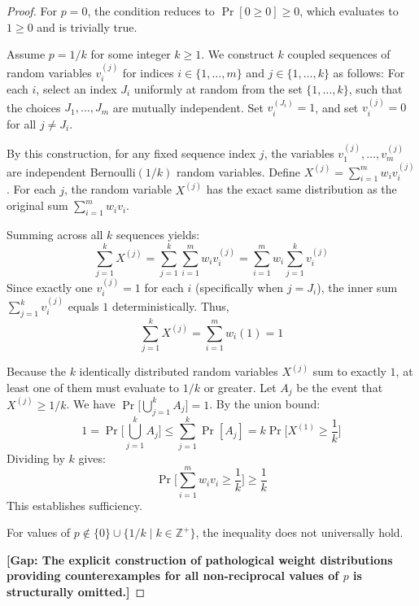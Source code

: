 \begin{proof}
For $p = 0$, the condition reduces to $\Pr[0 \ge 0] \ge 0$, which evaluates to $1 \ge 0$ and is trivially true.

Assume $p = 1/k$ for some integer $k \ge 1$. 
We construct $k$ coupled sequences of random variables $v_i^{(j)}$ for indices $i \in \{1, \dots, m\}$ and $j \in \{1, \dots, k\}$ as follows:
For each $i$, select an index $J_i$ uniformly at random from the set $\{1, \dots, k\}$, such that the choices $J_1, \ldots, J_m$ are mutually independent. 
Set $v_i^{(J_i)} = 1$, and set $v_i^{(j)} = 0$ for all $j \neq J_i$.

By this construction, for any fixed sequence index $j$, the variables $v_1^{(j)}, \ldots, v_m^{(j)}$ are independent Bernoulli$(1/k)$ random variables. 
Define $X^{(j)} = \sum_{i=1}^m w_i v_i^{(j)}$. 
For each $j$, the random variable $X^{(j)}$ has the exact same distribution as the original sum $\sum_{i=1}^m w_i v_i$.

Summing across all $k$ sequences yields:
\[\sum_{j=1}^k X^{(j)} = \sum_{j=1}^k \sum_{i=1}^m w_i v_i^{(j)} = \sum_{i=1}^m w_i \sum_{j=1}^k v_i^{(j)}\]
Since exactly one $v_i^{(j)} = 1$ for each $i$ (specifically when $j = J_i$), the inner sum $\sum_{j=1}^k v_i^{(j)}$ equals $1$ deterministically.
Thus,
\[\sum_{j=1}^k X^{(j)} = \sum_{i=1}^m w_i (1) = 1\]

Because the $k$ identically distributed random variables $X^{(j)}$ sum to exactly $1$, at least one of them must evaluate to $1/k$ or greater. 
Let $A_j$ be the event that $X^{(j)} \ge 1/k$. We have $\Pr\Big[\bigcup_{j=1}^k A_j\Big] = 1$.
By the union bound:
\[ 1 = \Pr\Big[\bigcup_{j=1}^k A_j\Big] \le \sum_{j=1}^k \Pr[A_j] = k \Pr\Big[X^{(1)} \ge \frac{1}{k}\Big] \]
Dividing by $k$ gives:
\[ \Pr\Big[\sum_{i=1}^m w_i v_i \ge \frac{1}{k}\Big] \ge \frac{1}{k} \]
This establishes sufficiency.

For values of $p \notin \{0\} \cup \{1/k \mid k \in \mathbb{Z}^+\}$, the inequality does not universally hold.

\vspace{\baselineskip}
\noindent\textbf{[Gap: The explicit construction of pathological weight distributions providing counterexamples for all non-reciprocal values of $p$ is structurally omitted.]}
\end{proof}